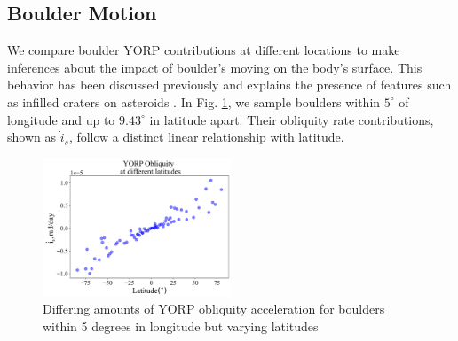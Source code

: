 \subsection{Boulder Motion}
We compare boulder YORP contributions at different locations to make inferences about the impact of boulder's moving on the body's surface. This behavior has been discussed previously and explains the presence of features such as infilled craters on asteroids \cite{Brack2019}. In Fig. \ref{fig:ob_motion_nodelta}, we sample boulders within $5^{\circ}$ of longitude and up to $9.43^{\circ}$ in latitude apart. Their obliquity rate contributions, shown as $\dot{i}_s$, follow a distinct linear relationship with latitude.
\begin{figure}[H]
    \centering
    \includegraphics[width=0.5\textwidth]{fig/obliq_amt_boulder_motion_bennu.png}
    \caption{Differing amounts of YORP obliquity acceleration for boulders within 5 degrees in longitude but varying latitudes}
    \label{fig:ob_motion_nodelta}
\end{figure}

